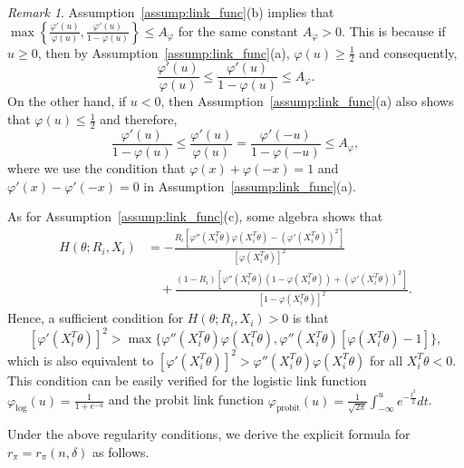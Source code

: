 \documentclass[ejsv2,noshowframe]{imsart}
\theoremstyle{plain}
\theoremstyle{definition}
\theoremstyle{remark}
\newtheorem{remark}{Remark}
\begin{document}
\begin{remark}
	\label{link_func_bound}
	Assumption~\ref{assump:link_func}(b) implies that $\max\left\{\frac{\varphi'(u)}{\varphi(u)}, \frac{\varphi'(u)}{1-\varphi(u)} \right\} \leq A_{\varphi}$
	for the same constant $A_{\varphi}>0$. This is because if $u\geq 0$, then by Assumption~\ref{assump:link_func}(a), $\varphi(u) \geq \frac{1}{2}$ and consequently, 
	$$\frac{\varphi'(u)}{\varphi(u)} \leq \frac{\varphi'(u)}{1-\varphi(u)}\leq A_{\varphi}.$$
	On the other hand, if $u<0$, then Assumption~\ref{assump:link_func}(a) also shows that $\varphi(u) \leq \frac{1}{2}$ and therefore,
	$$\frac{\varphi'(u)}{1-\varphi(u)} \leq \frac{\varphi'(u)}{\varphi(u)} = \frac{\varphi'(-u)}{1-\varphi(-u)} \leq A_{\varphi},$$
	where we use the condition that $\varphi(x)+\varphi(-x)=1$ and $\varphi'(x)-\varphi'(-x)=0$ in Assumption~\ref{assump:link_func}(a).
	
	As for Assumption~\ref{assump:link_func}(c), some algebra shows that
	\begin{align*}
	H(\theta;R_i,X_i) &= -\frac{R_i\left[\varphi''(X_i^T\theta) \varphi(X_i^T\theta) - \left(\varphi'(X_i^T\theta)\right)^2\right]}{\left[\varphi(X_i^T\theta)\right]^2} \\
	&\quad + \frac{(1-R_i)\left[\varphi''(X_i^T\theta) \left(1-\varphi(X_i^T\theta)\right) + \left(\varphi'(X_i^T\theta) \right)^2\right]}{\left[1-\varphi(X_i^T\theta)\right]^2}.
	\end{align*}
	Hence, a sufficient condition for $H(\theta;R_i,X_i)>0$ is that 
	\begin{equation}
		\label{link_func_convex_cond}
		\left[\varphi'(X_i^T\theta)\right]^2 > \max\Big\{\varphi''(X_i^T\theta) \varphi(X_i^T \theta), \varphi''(X_i^T\theta)\left[\varphi(X_i^T\theta)-1\right] \Big\},
	\end{equation}
	which is also equivalent to $\left[\varphi'(X_i^T\theta)\right]^2 > \varphi''(X_i^T\theta) \varphi(X_i^T\theta)$ for all $X_i^T\theta < 0$. This condition can be easily verified for the logistic link function $\varphi_{\mathrm{log}}(u) = \frac{1}{1+e^{-u}}$ and the probit link function $\varphi_{\mathrm{probit}}(u)=\frac{1}{\sqrt{2\pi}}\int_{-\infty}^u e^{-\frac{t^2}{2}} dt$.
\end{remark}

Under the above regularity conditions, we derive the explicit formula for $r_{\pi}=r_{\pi}(n,\delta)$ as follows.
\end{document}
